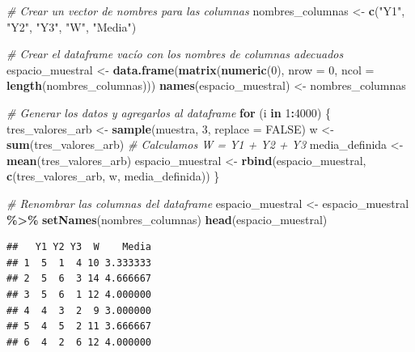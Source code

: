 \documentclass[
]{article}
\newenvironment{Shaded}{\begin{snugshade}}{\end{snugshade}}
\newcommand{\AttributeTok}[1]{\textcolor[rgb]{0.13,0.29,0.53}{#1}}
\newcommand{\CommentTok}[1]{\textcolor[rgb]{0.56,0.35,0.01}{\textit{#1}}}
\newcommand{\ConstantTok}[1]{\textcolor[rgb]{0.56,0.35,0.01}{#1}}
\newcommand{\ControlFlowTok}[1]{\textcolor[rgb]{0.13,0.29,0.53}{\textbf{#1}}}
\newcommand{\DecValTok}[1]{\textcolor[rgb]{0.00,0.00,0.81}{#1}}
\newcommand{\FunctionTok}[1]{\textcolor[rgb]{0.13,0.29,0.53}{\textbf{#1}}}
\newcommand{\NormalTok}[1]{#1}
\newcommand{\OtherTok}[1]{\textcolor[rgb]{0.56,0.35,0.01}{#1}}
\newcommand{\SpecialCharTok}[1]{\textcolor[rgb]{0.81,0.36,0.00}{\textbf{#1}}}
\newcommand{\StringTok}[1]{\textcolor[rgb]{0.31,0.60,0.02}{#1}}
\begin{document}
\begin{Shaded}
\begin{Highlighting}[]
\CommentTok{\# Crear un vector de nombres para las columnas}
\NormalTok{nombres\_columnas }\OtherTok{\textless{}{-}} \FunctionTok{c}\NormalTok{(}\StringTok{"Y1"}\NormalTok{, }\StringTok{"Y2"}\NormalTok{, }\StringTok{"Y3"}\NormalTok{, }\StringTok{"W"}\NormalTok{, }\StringTok{"Media"}\NormalTok{)}

\CommentTok{\# Crear el dataframe vacío con los nombres de columnas adecuados}
\NormalTok{espacio\_muestral }\OtherTok{\textless{}{-}} \FunctionTok{data.frame}\NormalTok{(}\FunctionTok{matrix}\NormalTok{(}\FunctionTok{numeric}\NormalTok{(}\DecValTok{0}\NormalTok{), }\AttributeTok{nrow =} \DecValTok{0}\NormalTok{, }\AttributeTok{ncol =} \FunctionTok{length}\NormalTok{(nombres\_columnas)))}
\FunctionTok{names}\NormalTok{(espacio\_muestral) }\OtherTok{\textless{}{-}}\NormalTok{ nombres\_columnas}

\CommentTok{\# Generar los datos y agregarlos al dataframe}
\ControlFlowTok{for}\NormalTok{ (i }\ControlFlowTok{in} \DecValTok{1}\SpecialCharTok{:}\DecValTok{4000}\NormalTok{) \{}
\NormalTok{  tres\_valores\_arb }\OtherTok{\textless{}{-}} \FunctionTok{sample}\NormalTok{(muestra, }\DecValTok{3}\NormalTok{, }\AttributeTok{replace =} \ConstantTok{FALSE}\NormalTok{)}
\NormalTok{  w }\OtherTok{\textless{}{-}} \FunctionTok{sum}\NormalTok{(tres\_valores\_arb)  }\CommentTok{\# Calculamos W = Y1 + Y2 + Y3}
\NormalTok{  media\_definida }\OtherTok{\textless{}{-}} \FunctionTok{mean}\NormalTok{(tres\_valores\_arb)}
\NormalTok{  espacio\_muestral }\OtherTok{\textless{}{-}} \FunctionTok{rbind}\NormalTok{(espacio\_muestral, }\FunctionTok{c}\NormalTok{(tres\_valores\_arb, w, media\_definida))}
\NormalTok{\}}

\CommentTok{\# Renombrar las columnas del dataframe}
\NormalTok{espacio\_muestral }\OtherTok{\textless{}{-}}\NormalTok{ espacio\_muestral }\SpecialCharTok{\%\textgreater{}\%}
  \FunctionTok{setNames}\NormalTok{(nombres\_columnas)}
\FunctionTok{head}\NormalTok{(espacio\_muestral)}
\end{Highlighting}
\end{Shaded}

\begin{verbatim}
##   Y1 Y2 Y3  W    Media
## 1  5  1  4 10 3.333333
## 2  5  6  3 14 4.666667
## 3  5  6  1 12 4.000000
## 4  4  3  2  9 3.000000
## 5  4  5  2 11 3.666667
## 6  4  2  6 12 4.000000
\end{verbatim}
\end{document}
